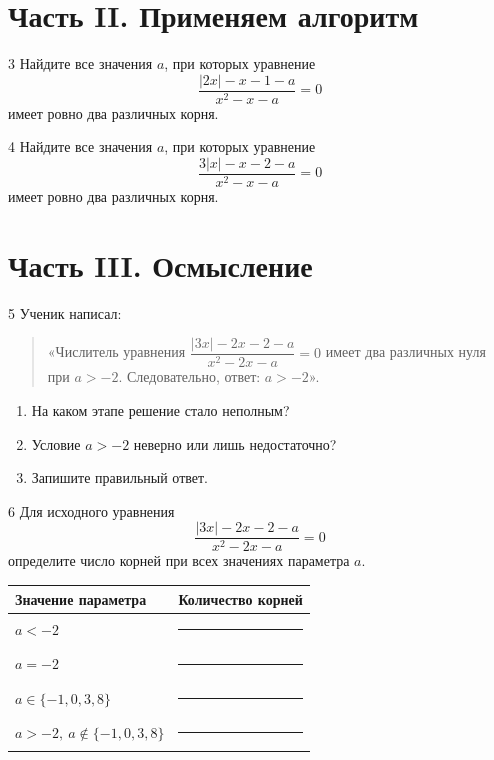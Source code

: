 \section*{Часть II. Применяем алгоритм}

\begin{homeworktask}{3}
  Найдите все значения \(a\), при которых уравнение
  \[
    \frac{|2x|-x-1-a}{x^2-x-a}=0
  \]
  имеет ровно два различных корня.
\end{homeworktask}
\structuredsolutionmap

\begin{homeworktask}{4}
  Найдите все значения \(a\), при которых уравнение
  \[
    \frac{3|x|-x-2-a}{x^2-x-a}=0
  \]
  имеет ровно два различных корня.
\end{homeworktask}
\reducedsolutionmap
\answerspace{25mm}

\section*{Часть III. Осмысление}

\begin{homeworktask}{5}
  Ученик написал:
  \begin{quote}
    «Числитель уравнения
    \(
      \dfrac{|3x|-2x-2-a}{x^2-2x-a}=0
    \)
    имеет два различных нуля при \(a>-2\). Следовательно, ответ:
    \(a>-2\)».
  \end{quote}

  \begin{enumerate}
    \item На каком этапе решение стало неполным?
    \item Условие \(a>-2\) неверно или лишь недостаточно?
    \item Запишите правильный ответ.
  \end{enumerate}
\end{homeworktask}
\answerspace{20mm}

\begin{homeworktask}{6}
  Для исходного уравнения
  \[
    \frac{|3x|-2x-2-a}{x^2-2x-a}=0
  \]
  определите число корней при всех значениях параметра \(a\).

  \begin{center}
    \renewcommand{\arraystretch}{1.45}
    \begin{tabularx}{0.9\textwidth}{>{\centering\arraybackslash}p{}>{\centering\arraybackslash}X}
      \toprule
      \rowcolor{TableHeader}
      Значение параметра & Количество корней \\
      \midrule
      \(a<-2\) & \rule{24mm}{0.4pt} \\
      \(a=-2\) & \rule{24mm}{0.4pt} \\
      \(a\in\{-1,0,3,8\}\) & \rule{24mm}{0.4pt} \\
      \(a>-2,\ a\notin\{-1,0,3,8\}\) & \rule{24mm}{0.4pt} \\
      \bottomrule
    \end{tabularx}
  \end{center}
\end{homeworktask}

